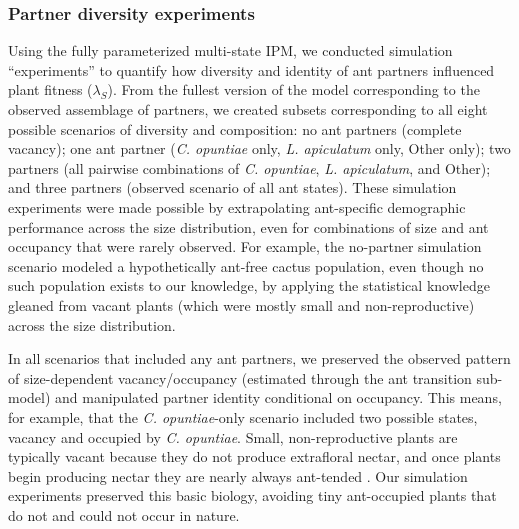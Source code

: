 \documentclass[11pt]{article}
\begin{document}
\subsubsection*{Partner diversity experiments}
Using the fully parameterized multi-state IPM, we conducted simulation ``experiments'' to quantify how diversity and identity of ant partners influenced plant fitness ($\lambda_{S}$). 
From the fullest version of the model corresponding to the observed assemblage of partners, we created subsets corresponding to all eight possible scenarios of diversity and composition: no ant partners (complete vacancy); one ant partner (\textit{C. opuntiae} only, \textit{L. apiculatum} only, Other only); two partners (all pairwise combinations of \textit{C. opuntiae}, \textit{L. apiculatum}, and Other); and three partners (observed scenario of all ant states).
These simulation experiments were made possible by extrapolating ant-specific demographic performance across the size distribution, even for combinations of size and ant occupancy that were rarely observed. 
For example, the no-partner simulation scenario modeled a hypothetically ant-free cactus population, even though no such population exists to our knowledge, by applying the statistical knowledge gleaned from vacant plants (which were mostly small and non-reproductive) across the size distribution. 

In all scenarios that included any ant partners, we preserved the observed pattern of size-dependent vacancy/occupancy (estimated through the ant transition sub-model) and manipulated partner identity conditional on occupancy. 
This means, for example, that the \textit{C. opuntiae}-only scenario included two possible states, vacancy and occupied by \textit{C. opuntiae}. 
Small, non-reproductive plants are typically vacant because they do not produce extrafloral nectar, and once plants begin producing nectar they are nearly always ant-tended \citep{Miller2014}. 
Our simulation experiments preserved this basic biology, avoiding tiny ant-occupied plants that do not and could not occur in nature. 
\end{document}
